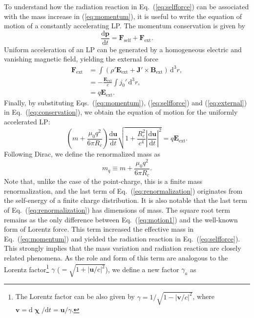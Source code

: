 \documentclass[a4paper,fleqn]{cas-sc}
\begin{document}
To understand how the radiation reaction in Eq.~(\ref{eq:selfforce}) can be associated with the mass increase in (\ref{eq:momentum}), it is useful to write the equation of motion of a constantly accelerating LP. The momentum conservation is given by
\begin{equation}
\displaystyle\frac{\mathrm{d}\mathbf{p}}{\mathrm{d}t} = \mathbf{F}_{\mathrm{self}} + \mathbf{F}_{\mathrm{ext}} . \label{eq:conservation}
\end{equation}
Uniform acceleration of an LP can be generated by a homogeneous electric and vanishing magnetic field, yielding the external force
\begin{align}
\mathbf{F}_{\mathrm{ext}} &= \int (\rho'\mathbf{E}_{\mathrm{ext}} + \mathbf{J}' \times \mathbf{B}_{\mathrm{ext}}) \,\mathrm{d}^{3}r , \nonumber \\
&= -\displaystyle\frac{\mathbf{E}_{\mathrm{ext}}}{c} \int j_{0}' \,\mathrm{d}^{3}r , \nonumber \\
&= q\mathbf{E}_{\mathrm{ext}} . \label{eq:external}
\end{align}
Finally, by substituting Eqs.~(\ref{eq:momentum}), (\ref{eq:selfforce}) and (\ref{eq:external}) in Eq.~(\ref{eq:conservation}), we obtain the equation of motion for the uniformly accelerated LP:
\begin{equation}
\left(m + \displaystyle\frac{\mu_{0}q^{2}}{6\pi R_{c}}\right) \displaystyle\frac{\mathrm{d}\mathbf{u}}{\mathrm{d}t} \sqrt{1 + \displaystyle\frac{R_{c}^{2}}{c^{4}} \left|\displaystyle\frac{\mathrm{d}\mathbf{u}}{\mathrm{d}t}\right|^{2}} = q\mathbf{E}_{\mathrm{ext}} . \label{eq:motion1}
\end{equation}
Following Dirac, we define the renormalized mass as
\begin{equation}
m_{q} \equiv m + \displaystyle\frac{\mu_{0}q^{2}}{6\pi R_{c}} . \label{eq:renormalization}
\end{equation}
Note that, unlike the case of the point-charge, this is a finite mass renormalization, and the last term of Eq.~(\ref{eq:renormalization}) originates from the self-energy of a finite charge distribution. It is also notable that the last term of Eq.~(\ref{eq:renormalization}) has dimensions of mass. The square root term remains as the only difference between Eq.~(\ref{eq:motion1}) and the well-known form of Lorentz force. This term increased the effective mass in Eq.~(\ref{eq:momentum}) and yielded the radiation reaction in Eq.~(\ref{eq:selfforce}). This strongly implies that the mass variation and radiation reaction are closely related phenomena. As the role and form of this term are analogous to the Lorentz factor\footnote{The Lorentz factor can be also given by $\gamma = 1/\sqrt{1-\left|\mathbf{v}/c\right|^{2}}$, where $\mathbf{v} = \mathrm{d}\boldsymbol{\upchi}/\mathrm{d}t = \mathbf{u}/\gamma$.} $\gamma$ ($=\sqrt{1+\left|\mathbf{u}/c\right|^{2}}$), we define a new factor $\gamma_{a}$ as
\end{document}
